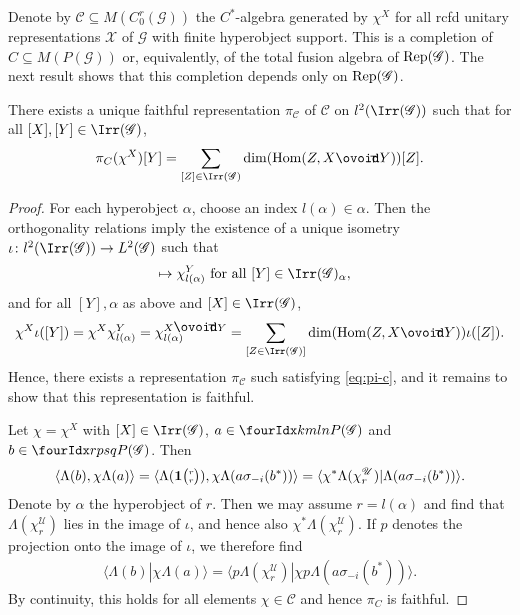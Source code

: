 Denote by $\mathcal{C} \subseteq M(C_{0}^{r}(\mathscr{G}))$ the
$C^{*}$-algebra generated by $\chi^{X}$ for all rcfd unitary
representations $\mathscr{X}$ of $\mathscr{G}$ with finite hyperobject
support. This is a completion of $C\subseteq M(P(\mathscr{G}))$ or,
equivalently, of the total fusion algebra of $\mathrm{Rep}(\mathscr{G}) $. The
next result shows that this completion depends only on
$\mathrm{Rep}(\mathscr{G})$.
\begin{Prop}
  There exists a unique faithful representation $\pi_{\mathcal{C}}$ of
  $\mathcal{C}$ on $l^{2}(\Irr(\mathscr{G}))$ such that for all
  $[X],[Y] \in \Irr(\mathscr{G})$,
  \begin{align} \label{eq:pi-c}
    \pi_{C}(\chi^{X})[Y] = \sum_{[Z] \in \Irr(\mathscr{G})}
    \dim(\Hom(Z,X\Circt Y))[Z].
  \end{align}
\end{Prop}
\begin{proof}
  For each hyperobject $\alpha$, choose an index $l(\alpha) \in
  \alpha$. Then the orthogonality relations \cite[Corollary
2.23]{DCT1} imply the existence of a unique isometry $\iota\colon
  l^{2}(\Irr(\mathscr{G})) \to L^{2}(\mathscr{G})$ such that
\begin{align*}
  [Y] &\mapsto \chi^{Y}_{l(\alpha)} \text{ for all } [Y] \in
  \Irr(\mathscr{G})_{\alpha},
\end{align*}
 and for all $[Y],\alpha$ as above and $[X] \in
\Irr(\mathscr{G})$,
\begin{align*}
  \chi^{X}\iota([Y]) = \chi^{X}\chi^{Y}_{l(\alpha)} = \chi^{X \Circt
    Y}_{l(\alpha)} =  \sum_{[Z \in \Irr(\mathscr{G})]}
  \dim(\Hom(Z,X\Circt Y)) \iota([Z]).
\end{align*}
Hence,   there   exists  a representation $\pi_{\mathcal{C}}$ such
satisfying \eqref{eq:pi-c}, and it remains to show that this
representation is faithful. 

Let $\chi = \chi^X$ with $[X] \in \Irr(\mathscr{G})$, $a\in
\Gr{P(\mathscr{G})}{k}{l}{m}{n}$ and $b\in
\Gr{P(\mathscr{G})}{r}{s}{p}{q}$. Then
\begin{align*}
  \langle
\Lambda(b),\chi \Lambda(a)\rangle = \langle \Lambda(
\mathbf{1}{\tiny {\begin{pmatrix} r\\r\end{pmatrix}}}),\chi \Lambda(a\sigma_{-i}(b^*))\rangle  =
 \langle \chi^{*} \Lambda(\chi^{\mathscr{U}}_{r})  |
 \Lambda(a\sigma_{-i}(b^*))\rangle.
\end{align*}
Denote by $\alpha$ the hyperobject of $r$. Then we may assume
$r=l(\alpha)$ and find that $\Lambda(\chi^{\mathscr{U}}_{r})$ lies in
the image of $\iota$, and hence also $\chi^{*}
\Lambda(\chi^{\mathscr{U}}_{r})$. If $p$ denotes the projection onto
the image of $\iota$, we therefore find
\begin{align*}
  \langle
\Lambda(b) | \chi \Lambda(a)\rangle = 
 \langle p \Lambda(\chi^{\mathscr{U}}_{r})  | \chi
p \Lambda(a\sigma_{-i}(b^*))\rangle.
\end{align*}
By continuity, this holds for all elements $\chi \in \mathcal{C}$ and hence $\pi_{C}$ is faithful.
\end{proof}


